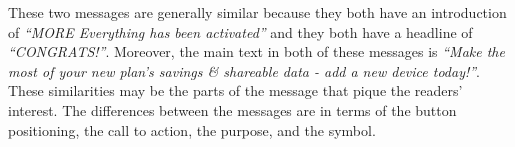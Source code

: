 


These two messages are generally similar because they both have an introduction of \textit{``MORE Everything has been activated''} and they both have a headline of \textit{``CONGRATS!''}. Moreover, the main text in both of these messages is \textit{``Make the most of your new plan’s savings \& shareable data - add a new device today!''}. These similarities may be the parts of the message that pique the readers' interest. The differences between the messages are in terms of the button positioning, the call to action, the purpose, and the symbol.



% 


